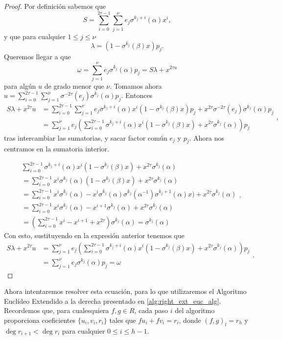 \begin{proof}
Por definición sabemos que
\[
S = \sum_{i = 0}^{2\tau-1} \sum_{j=1}^{\nu} e_j \sigma^{k_j + i}(\alpha) x^i
,\]
y que para cualquier \(1 \leq j \leq \nu\)
\[
\lambda = (1 - \sigma^{k_j}(\beta)x)p_j
.\]
Queremos llegar a que
\[
\omega = \sum_{j=1}^{\nu} e_j \sigma^{k_j}(\alpha)p_j = S\lambda + x^{2\tau u}
\]
para algún \(u\) de grado menor que \(\nu\). Tomamos ahora \(u = \sum_{i = 0}^{2\tau-1} \sum_{j=1}^{\nu} \sigma^{-2\tau}(e_j)\sigma^{k_j}(\alpha)p_j\). Entonces
\[
\begin{aligned}
S\lambda + x^{2\tau} u &= \sum_{i = 0}^{2\tau-1} \sum_{j=1}^{\nu} e_j\sigma^{k_j + i}(\alpha)x^i(1-\sigma^{k_j}(\beta)x)p_j + x^{2\tau}\sigma^{-2\tau}(e_j)\sigma^{k_j}(\alpha)p_j \\
&= \sum_{j=1}^{\nu} e_j \left( \sum_{i = 0}^{2\tau-1} \sigma^{k_j + i}(\alpha)x^i(1-\sigma^{k_j}(\beta)x) + x^{2\tau}\sigma^{k_j}(\alpha)\right)p_j
\end{aligned}
,\]
tras intercambiar las sumatorias, y sacar factor común \(e_j\) y \(p_j\). Ahora nos centramos en la sumatoria interior.

\[
\begin{aligned}
&\sum_{i = 0}^{2\tau-1} \sigma^{k_j + i}(\alpha)x^i(1-\sigma^{k_j}(\beta)x) + x^{2\tau}\sigma^{k_j}(\alpha) \\
&= \sum_{i = 0}^{2\tau-1} x^i \sigma^{k_j}(\alpha) (1-\sigma^{k_j}(\beta)x) + x^{2\tau}\sigma^{k_j}(\alpha) \\
&= \sum_{i = 0}^{2\tau-1} x^i \sigma^{k_j}(\alpha) - x^i \sigma^{k_j}(\alpha)\sigma^{k_j}(\alpha^{-1})\sigma^{k_j + 1}(\alpha) x) + x^{2\tau}\sigma^{k_j}(\alpha)\\
&=\sum_{i = 0}^{2\tau-1} x^i \sigma^{k_j}(\alpha) - x^{i+1} \sigma^{k_j}(\alpha) + x^{2\tau}\sigma^{k_j}(\alpha)\\
&=\left(\sum_{i = 0}^{2\tau-1} x^i  - x^{i+1} + x^{2\tau}\right)\sigma^{k_j}(\alpha) = \sigma^{k_j}(\alpha)
\end{aligned}
.\]
Con esto, sustituyendo en la expresión anterior tenemos que
\[
\begin{aligned}
S\lambda + x^{2\tau} u &= \sum_{j=1}^{\nu} e_j \left( \sum_{i = 0}^{2\tau-1} \sigma^{k_j + i}(\alpha)x^i(1-\sigma^{k_j}(\beta)x) + x^{2\tau}\sigma^{k_j}(\alpha)\right)p_j \\
&= \sum_{j=1}^{\nu} e_j \sigma^{k_j}(\alpha) p_j = \omega
\end{aligned}
.\]
\end{proof}

Ahora intentaremos resolver esta ecuación, para lo que utilizaremos el Algoritmo Euclídeo Extendido a la derecha presentado en \ref{alg:right_ext_euc_alg}. Recordemos que, para cualesquiera $f,g \in R$, cada paso $i$ del algoritmo proporciona coeficientes $\{u_{i}, v_{i}, r_{i}\}$ tales que $fu_{i} + fv_{i} = r_{i}$, donde ${(f,g)}_l = r_h$ y $\deg r_{i+1} < \deg r_{i}$ para cualquier $0 \le i \le h-1$.

